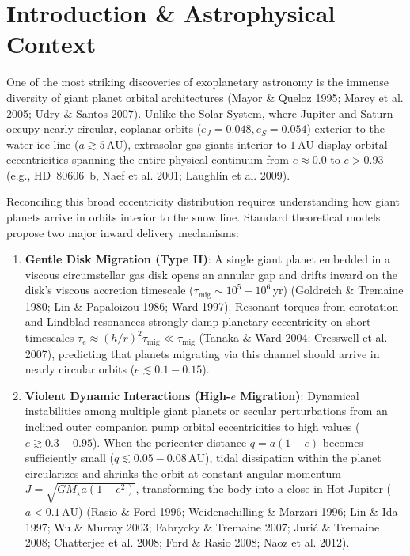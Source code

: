 \documentclass[11pt,a4paper]{article}
\begin{document}
\section{Introduction \& Astrophysical Context}
One of the most striking discoveries of exoplanetary astronomy is the immense diversity of giant planet orbital architectures (Mayor \& Queloz 1995; Marcy et al. 2005; Udry \& Santos 2007). Unlike the Solar System, where Jupiter and Saturn occupy nearly circular, coplanar orbits ($e_J = 0.048, e_S = 0.054$) exterior to the water-ice line ($a \gtrsim 5\,\text{AU}$), extrasolar gas giants interior to $1\,\text{AU}$ display orbital eccentricities spanning the entire physical continuum from $e \approx 0.0$ to $e > 0.93$ (e.g., HD~80606~b, Naef et al. 2001; Laughlin et al. 2009).

Reconciling this broad eccentricity distribution requires understanding how giant planets arrive in orbits interior to the snow line. Standard theoretical models propose two major inward delivery mechanisms:
\begin{enumerate}
    \item \textbf{Gentle Disk Migration (Type II)}: A single giant planet embedded in a viscous circumstellar gas disk opens an annular gap and drifts inward on the disk's viscous accretion timescale ($\tau_{\text{mig}} \sim 10^5 - 10^6\,\text{yr}$) (Goldreich \& Tremaine 1980; Lin \& Papaloizou 1986; Ward 1997). Resonant torques from corotation and Lindblad resonances strongly damp planetary eccentricity on short timescales $\tau_e \approx (h/r)^2 \tau_{\text{mig}} \ll \tau_{\text{mig}}$ (Tanaka \& Ward 2004; Cresswell et al. 2007), predicting that planets migrating via this channel should arrive in nearly circular orbits ($e \lesssim 0.1 - 0.15$).
    \item \textbf{Violent Dynamic Interactions (High-$e$ Migration)}: Dynamical instabilities among multiple giant planets or secular perturbations from an inclined outer companion pump orbital eccentricities to high values ($e \gtrsim 0.3 - 0.95$). When the pericenter distance $q = a(1-e)$ becomes sufficiently small ($q \lesssim 0.05 - 0.08\,\text{AU}$), tidal dissipation within the planet circularizes and shrinks the orbit at constant angular momentum $J = \sqrt{G M_\star a (1-e^2)}$, transforming the body into a close-in Hot Jupiter ($a < 0.1\,\text{AU}$) (Rasio \& Ford 1996; Weidenschilling \& Marzari 1996; Lin \& Ida 1997; Wu \& Murray 2003; Fabrycky \& Tremaine 2007; Juri{\'c} \& Tremaine 2008; Chatterjee et al. 2008; Ford \& Rasio 2008; Naoz et al. 2012).
\end{enumerate}
\end{document}
